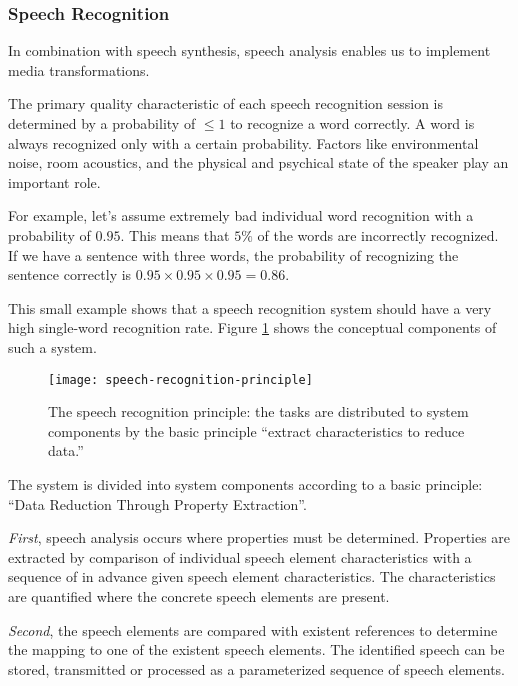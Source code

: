 \subsubsection{Speech Recognition}
In combination with speech synthesis, speech analysis enables us to implement media transformations.

The primary quality characteristic of each speech recognition session is determined by a probability of $ \leq 1 $ to recognize a word correctly. A word is always recognized only with a certain probability. Factors like environmental noise, room acoustics,
and the physical and psychical state of the speaker play an important role. 

For example, let's assume extremely bad individual word recognition with a probability of \(0.95\). This means that \(5\%\) of the words are incorrectly recognized. If we have a sentence with three words, the probability of recognizing the sentence correctly is
\(0.95 \times 0.95 \times 0.95 = 0.86\). 

This small example shows that a speech recognition system should have a very
high single-word recognition rate. Figure {\ref{fig:speech-recognition-principle}} shows the conceptual components of such a system.

\begin{figure}[hb!]
	\centering
	\texttt{[image: speech-recognition-principle]}
	\caption[The speech recognition principle]{The speech recognition principle: the tasks are distributed to system components by the basic principle ``extract characteristics to reduce data.''}\label{fig:speech-recognition-principle}
\end{figure}


The system is divided into system components according to a basic principle: ``Data Reduction Through Property Extraction''. 

 \textit{First}, speech analysis occurs where properties must be determined. Properties are extracted by comparison of individual speech element characteristics with a sequence of in advance given speech element characteristics. The characteristics are quantified where the concrete speech elements are present.


\textit{Second}, the speech elements are compared with existent references to determine the mapping to one of the existent speech elements. The identified speech can be stored,
transmitted or processed as a parameterized sequence of speech elements.

